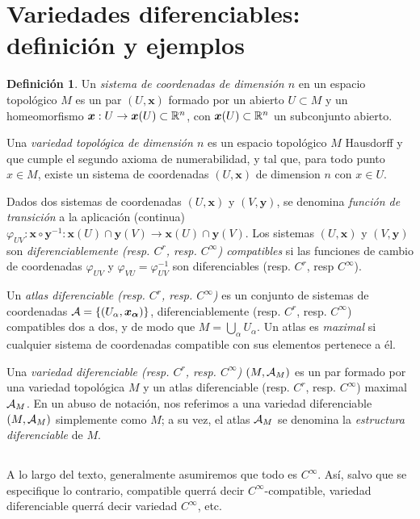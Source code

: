 \documentclass[11pt,a4paper]{amsbook}
\theoremstyle{remark} \newtheorem{rmk}[subsection]{Observación}
\theoremstyle{definition} \newtheorem{defn}[subsection]{Definición}
\theoremstyle{definition} \newtheorem{ex}[subsection]{Ejemplo}
\theoremstyle{definition} \newtheorem{ej}[subsection]{Ejercicio}
\begin{document}
\section{Variedades diferenciables: definición y ejemplos}

\begin{defn}
  Un \emph{sistema de coordenadas de dimensión $n$} en un espacio topológico $M$ es un par $(U,\bm{x})$ formado por un abierto $U\subset M$ y un homeomorfismo $\bm{x}: U \rightarrow \bm{x}(U)\subset \mathbb R^n$, con $\bm{x}(U)\subset \mathbb R^n$ un subconjunto abierto.

  Una \emph{variedad topológica de dimensión $n$} es un espacio topológico $M$ Hausdorff y que cumple el segundo axioma de numerabilidad, y tal que, para todo punto $x\in M$, existe un sistema de coordenadas $(U,\bm{x})$ de dimension $n$ con $x\in U$.

  Dados dos sistemas de coordenadas $(U,\bm{x})$ y $(V,\bm{y})$, se denomina \emph{función de transición} a la aplicación (continua) $\varphi_{UV}:\bm{x} \circ \bm{y}^{-1}: \bm{x}(U)\cap \bm{y}(V) \rightarrow \bm{x}(U) \cap \bm{y}(V)$. Los sistemas $(U,\bm{x})$ y $(V,\bm{y})$ son \emph{diferenciablemente (resp. $C^r$, resp. $C^\infty$) compatibles} si las funciones de cambio de coordenadas $\varphi_{UV}$ y $\varphi_{VU}=\varphi_{UV}^{-1}$ son diferenciables (resp. $C^r$, resp $C^\infty$).


  Un \emph{atlas diferenciable (resp. $C^r$, resp. $C^\infty$)} es un conjunto de sistemas de coordenadas $\mathcal A=\left\{ (U_\alpha,\bm{x_\alpha})\right\}$, diferenciablemente (resp. $C^r$, resp. $C^\infty$) compatibles dos a dos, y de modo que $M=\bigcup_{\alpha} U_\alpha$. Un atlas es \emph{maximal} si cualquier sistema de coordenadas compatible con sus elementos pertenece a él.

  Una \emph{variedad diferenciable (resp. $C^r$, resp. $C^\infty$)} $(M,\mathcal A_M)$ es un par formado por una variedad topológica $M$ y un atlas diferenciable (resp. $C^r$, resp. $C^\infty$) maximal $\mathcal A_M$. En un abuso de notación, nos referimos a una variedad diferenciable $(M,\mathcal A_M)$ simplemente como $M$; a su vez, el atlas $\mathcal A_M$ se denomina la \emph{estructura diferenciable} de $M$.
\end{defn}

\subsection{}
A lo largo del texto, generalmente asumiremos que todo es $C^\infty$. Así, salvo que se especifique lo contrario, compatible querrá decir $C^\infty$-compatible, variedad diferenciable querrá decir variedad $C^\infty$, etc.
\end{document}
